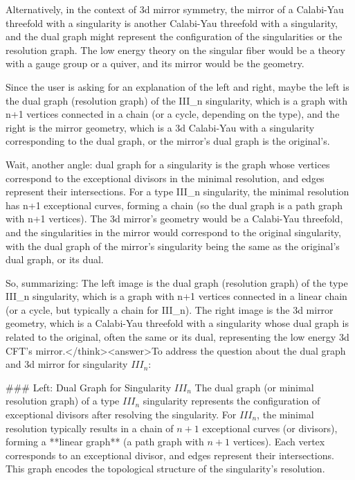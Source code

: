 Alternatively, in the context of 3d mirror symmetry, the mirror of a Calabi-Yau threefold with a singularity is another Calabi-Yau threefold with a singularity, and the dual graph might represent the configuration of the singularities or the resolution graph. The low energy theory on the singular fiber would be a theory with a gauge group or a quiver, and its mirror would be the geometry.

Since the user is asking for an explanation of the left and right, maybe the left is the dual graph (resolution graph) of the III_n singularity, which is a graph with n+1 vertices connected in a chain (or a cycle, depending on the type), and the right is the mirror geometry, which is a 3d Calabi-Yau with a singularity corresponding to the dual graph, or the mirror's dual graph is the original's.

Wait, another angle: dual graph for a singularity is the graph whose vertices correspond to the exceptional divisors in the minimal resolution, and edges represent their intersections. For a type III_n singularity, the minimal resolution has n+1 exceptional curves, forming a chain (so the dual graph is a path graph with n+1 vertices). The 3d mirror's geometry would be a Calabi-Yau threefold, and the singularities in the mirror would correspond to the original singularity, with the dual graph of the mirror's singularity being the same as the original's dual graph, or its dual.

So, summarizing: The left image is the dual graph (resolution graph) of the type III_n singularity, which is a graph with n+1 vertices connected in a linear chain (or a cycle, but typically a chain for III_n). The right image is the 3d mirror geometry, which is a Calabi-Yau threefold with a singularity whose dual graph is related to the original, often the same or its dual, representing the low energy 3d CFT's mirror.</think><answer>To address the question about the dual graph and 3d mirror for singularity \( III_n \):  

### Left: Dual Graph for Singularity \( III_n \)  
The dual graph (or minimal resolution graph) of a type \( III_n \) singularity represents the configuration of exceptional divisors after resolving the singularity. For \( III_n \), the minimal resolution typically results in a chain of \( n+1 \) exceptional curves (or divisors), forming a **linear graph** (a path graph with \( n+1 \) vertices). Each vertex corresponds to an exceptional divisor, and edges represent their intersections. This graph encodes the topological structure of the singularity’s resolution.  

